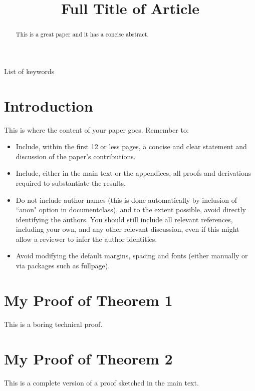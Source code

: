 \documentclass[anon,12pt]{colt2017} %
\title[Short Title]{Full Title of Article}
\begin{document}
\maketitle

\begin{abstract}
This is a great paper and it has a concise abstract.
\end{abstract}

\begin{keywords}
List of keywords
\end{keywords}

\section{Introduction}

This is where the content of your paper goes.  Remember to:
\begin{itemize}
\item Include, within the first 12 or less pages, a concise and clear statement and discussion of the paper's contributions. %
\item Include, either in the main text or the appendices, all proofs
  and derivations required to substantiate the results.
\item Do not include author names (this is done automatically by inclusion of ``anon" option in documentclass), and to
  the extent possible, avoid directly identifying the authors.  You
  should still include all relevant references, including your own,
  and any other relevant discussion, even if this might allow a
  reviewer to infer the author identities.
\item Avoid modifying the default margins, spacing and fonts (either manually or via packages such as fullpage).
\end{itemize}






\appendix

\section{My Proof of Theorem 1}

This is a boring technical proof.

\section{My Proof of Theorem 2}

This is a complete version of a proof sketched in the main text.
\end{document}
